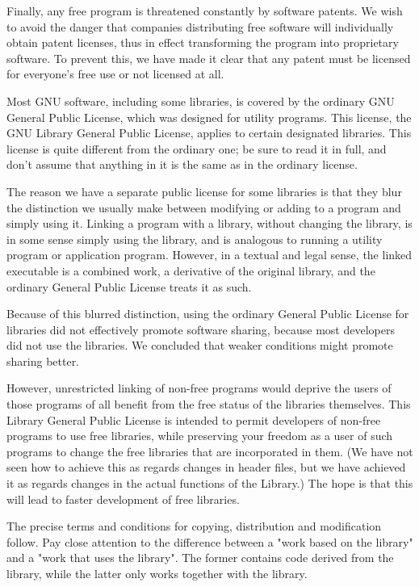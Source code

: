 Finally, any free program is threatened constantly by software patents. We wish to avoid the danger that companies distributing free software will individually obtain patent licenses, thus in effect transforming the program into proprietary software. To prevent this, we have made it clear that any patent must be licensed for everyone's free use or not licensed at all. 

Most GNU software, including some libraries, is covered by the ordinary GNU General Public License, which was designed for utility programs. This license, the GNU Library General Public License, applies to certain designated libraries. This license is quite different from the ordinary one; be sure to read it in full, and don't assume that anything in it is the same as in the ordinary license. 

The reason we have a separate public license for some libraries is that they blur the distinction we usually make between modifying or adding to a program and simply using it. Linking a program with a library, without changing the library, is in some sense simply using the library, and is analogous to running a utility program or application program. However, in a textual and legal sense, the linked executable is a combined work, a derivative of the original library, and the ordinary General Public License treats it as such. 

Because of this blurred distinction, using the ordinary General Public License for libraries did not effectively promote software sharing, because most developers did not use the libraries. We concluded that weaker conditions might promote sharing better. 

However, unrestricted linking of non-free programs would deprive the users of those programs of all benefit from the free status of the libraries themselves. This Library General Public License is intended to permit developers of non-free programs to use free libraries, while preserving your freedom as a user of such programs to change the free libraries that are incorporated in them. (We have not seen how to achieve this as regards changes in header files, but we have achieved it as regards changes in the actual functions of the Library.) The hope is that this will lead to faster development of free libraries. 

The precise terms and conditions for copying, distribution and modification follow. Pay close attention to the difference between a "work based on the library" and a "work that uses the library". The former contains code derived from the library, while the latter only works together with the library. 

